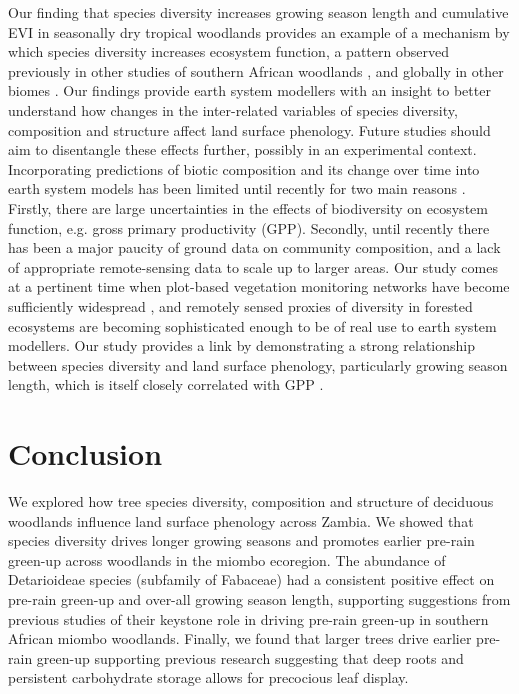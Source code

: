 \documentclass[11pt,a4paper]{article}
\begin{document}
Our finding that species diversity increases growing season length and
cumulative EVI in seasonally dry tropical woodlands provides an example of a
mechanism by which species diversity increases ecosystem function, a pattern
observed previously in other studies of southern African woodlands
\citep{Godlee2021, McNicol2018, Shirima2015}, and globally in other biomes
\citep{Plas2019, Tilman2014}. Our findings provide earth system modellers with
an insight to better understand how changes in the inter-related variables of
species diversity, composition and structure affect land surface phenology.
Future studies should aim to disentangle these effects further, possibly in an
experimental context. Incorporating predictions of biotic composition and its
change over time into earth system models has been limited until recently for
two main reasons \citep{Ahlstrom2015, Bodegom2011}. Firstly, there are large
uncertainties in the effects of biodiversity on ecosystem function, e.g. gross
primary productivity (GPP). Secondly, until recently there has been a major
paucity of ground data on community composition, and a lack of appropriate
remote-sensing data to scale up to larger areas. Our study comes at a pertinent
time when plot-based vegetation monitoring networks have become sufficiently
widespread \citep{ForestPlotsnet2021, SEOSAW2020}, and remotely sensed proxies
of diversity in forested ecosystems are becoming sophisticated enough
\citep{Schneider2017, Cavendar2020} to be of real use to earth system
modellers. Our study provides a link by demonstrating a strong relationship
between species diversity and land surface phenology, particularly growing
season length, which is itself closely correlated with GPP
\citep{Sjostrom2011}. 

\section{Conclusion}

We explored how tree species diversity, composition and structure of deciduous
woodlands influence land surface phenology across Zambia. We showed that
species diversity drives longer growing seasons and promotes earlier pre-rain
green-up across woodlands in the miombo ecoregion. The abundance of
Detarioideae species (subfamily of Fabaceae) had a consistent positive effect
on pre-rain green-up and over-all growing season length, supporting suggestions
from previous studies of their keystone role in driving pre-rain green-up in
southern African miombo woodlands. Finally, we found that larger trees drive
earlier pre-rain green-up supporting previous research suggesting that deep
roots and persistent carbohydrate storage allows for precocious leaf display.
\end{document}
